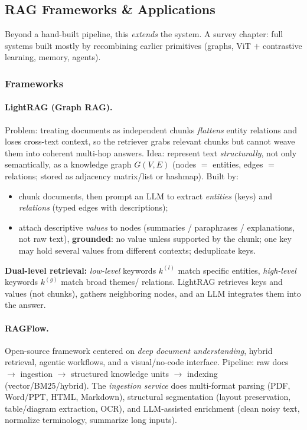 \documentclass{article}
\begin{document}
\subsection{RAG Frameworks \& Applications}
Beyond a hand-built pipeline, this \textit{extends} the system. A survey chapter: full systems built mostly by recombining earlier primitives (graphs, ViT $+$ contrastive learning, memory, agents).

\subsubsection{Frameworks}
\paragraph{LightRAG (Graph RAG).} Problem: treating documents as independent chunks \textit{flattens} entity relations and loses cross-text context, so the retriever grabs relevant chunks but cannot weave them into coherent multi-hop answers. Idea: represent text \textit{structurally}, not only semantically, as a knowledge graph $G(V,E)$ (nodes $=$ entities, edges $=$ relations; stored as adjacency matrix/list or hashmap). Built by:
\begin{itemize}
    \item chunk documents, then prompt an LLM to extract \textit{entities} (keys) and \textit{relations} (typed edges with descriptions);
    \item attach descriptive \textit{values} to nodes (summaries / paraphrases / explanations, not raw text), \textbf{grounded}: no value unless supported by the chunk; one key may hold several values from different contexts; deduplicate keys.
\end{itemize}
\textbf{Dual-level retrieval:} \textit{low-level} keywords $k^{(l)}$ match specific entities, \textit{high-level} keywords $k^{(g)}$ match broad themes/ relations. LightRAG retrieves keys and values (not chunks), gathers neighboring nodes, and an LLM integrates them into the answer.

\paragraph{RAGFlow.} Open-source framework centered on \textit{deep document understanding}, hybrid retrieval, agentic workflows, and a visual/no-code interface. Pipeline: raw docs $\rightarrow$ ingestion $\rightarrow$ structured knowledge units $\rightarrow$ indexing (vector/BM25/hybrid). The \textit{ingestion service} does multi-format parsing (PDF, Word/PPT, HTML, Markdown), structural segmentation (layout preservation, table/diagram extraction, OCR), and LLM-assisted enrichment (clean noisy text, normalize terminology, summarize long inputs).
\end{document}
